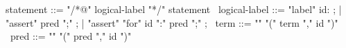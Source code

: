 \begin{syntax}
  statement ::= "/*@" logical-label "*/" statement \
  logical-label ::= "label" id: ;
  | "assert" pred ";" ;
  | "assert" "for" id ":" pred ";" ;
  \
  term ::= "\at" "(" term "," id ")" 
  \
  pred ::= "\at" "(" pred "," id ")" 
\end{syntax}
